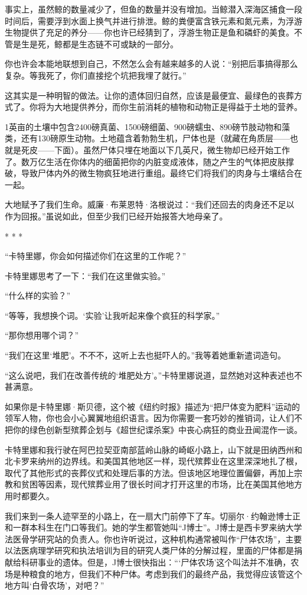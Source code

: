 \documentclass[12pt,oneside]{book}
\begin{document}
\begin{bookref}[frametitle={\cite{好好告别}}]
事实上，虽然鲸的数量减少了，但鱼的数量并没有增加。当鲸潜入深海区捕食一段时间后，需要浮到水面上换气并进行排泄。鲸的粪便富含铁元素和氮元素，为浮游生物提供了充足的养分——你也许已经猜到了，浮游生物正是鱼和磷虾的美食。不管是生是死，鲸都是生态链不可或缺的一部分。

你也许会本能地联想到自己，不然怎么会有越来越多的人说：“别把后事搞得那么复杂。等我死了，你们直接挖个坑把我埋了就行。”

这其实是一种明智的做法。让你的遗体回归自然，应该是最便宜、最绿色的丧葬方式了。你将为大地提供养分，而你生前消耗的植物和动物正是得益于土地的营养。

1英亩的土壤中包含2400磅真菌、1500磅细菌、900磅蠕虫、890磅节肢动物和藻类，还有130磅原生动物。土地蕴含着勃勃生机，尸体也是（就藏在角质层——也就是死皮——下面）。虽然尸体只埋在地面以下几英尺，微生物却已经开始工作了。数万亿生活在你体内的细菌把你的内脏变成液体，随之产生的气体把皮肤撑破，导致尸体内外的微生物疯狂地进行重组。最终它们将我们的肉身与土壤结合在一起。

大地赋予了我们生命。威廉·布莱恩特·洛根说过：“我们还回去的肉身还不足以作为回报。”虽说如此，但至少我们已经开始报答大地母亲了。

\begin{center}
* * *
\end{center}

“卡特里娜，你会如何描述你们在这里的工作呢？”

卡特里娜思考了一下：“我们在这里做实验。”

“什么样的实验？”

“等等，我想换个词。‘实验’让我听起来像个疯狂的科学家。”

“那你想用哪个词？”

“我们在这里‘堆肥’。不不不，这听上去也挺吓人的。”我等着她重新遣词造句。

“这么说吧，我们在改善传统的‘堆肥处方’。”卡特里娜说道，显然她对这种表述也不甚满意。

如果你是卡特里娜·斯贝德，这个被《纽约时报》描述为“把尸体变为肥料”运动的领军人物，你也会小心翼翼地组织语言。因为你需要一套巧妙的推销词，让人们不把你的绿色创新型殡葬企划与《超世纪谍杀案》中丧心病狂的商业丑闻混作一谈。

卡特里娜和我行驶在阿巴拉契亚南部蓝岭山脉的崎岖小路上，山下就是田纳西州和北卡罗来纳州的边界线。和美国其他地区一样，现代殡葬业在这里深深地扎了根，取代了其他形式的丧葬仪式和处理后事的方法。但该地区地理位置偏僻，再加上宗教和贫困等因素，现代殡葬业用了很长时间才打开这里的市场，比在美国其他地方用时都要久。

我们来到一条人迹罕至的小路上，在一扇大门前停下了车。切丽尔·约翰逊博士正和一群本科生在门口等我们。她的学生都管她叫“J博士”。J博士是西卡罗来纳大学法医骨学研究站的负责人。你也许听说过，这种机构通常被叫作“尸体农场”，主要以法医病理学研究和执法培训为目的研究人类尸体的分解过程，里面的尸体都是捐献给科研事业的遗体。但是，J博士很快指出：“‘尸体农场’这个叫法并不准确，农场是种粮食的地方，但我们不种尸体。考虑到我们的最终产品，我觉得应该管这个地方叫‘白骨农场’，对吧？”


\end{bookref}
\end{document}
